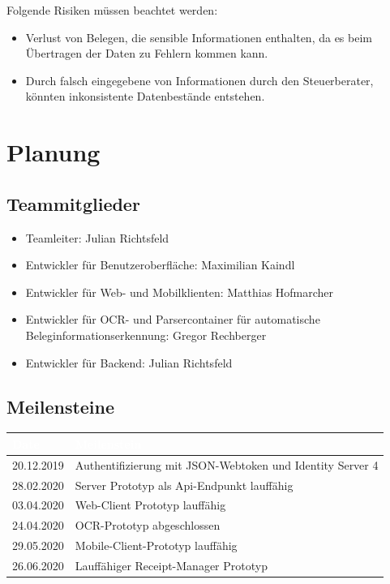 \documentclass[12pt]{article}
\theoremstyle{definition}
\begin{document}
Folgende Risiken müssen beachtet werden:
\begin{itemize}
\item Verlust von Belegen, die sensible Informationen enthalten, da es beim Übertragen der Daten zu Fehlern kommen kann.
\item Durch falsch eingegebene von Informationen durch den Steuerberater, könnten inkonsistente Datenbestände entstehen.
\end{itemize}

\pagebreak

\section{Planung}

\subsection{Teammitglieder}

\begin{itemize}
\item Teamleiter: Julian Richtsfeld
\item Entwickler für Benutzeroberfläche: Maximilian Kaindl
\item Entwickler für Web- und Mobilklienten: Matthias Hofmarcher
\item Entwickler für OCR- und Parsercontainer für automatische Beleginformationserkennung: Gregor Rechberger
\item Entwickler für Backend: Julian Richtsfeld
\end{itemize}

\subsection{Meilensteine}

\begin{tabular}{|l|l|}
\hline
\cellcolor[gray]{0.5}\textcolor{white}{Date} & \cellcolor[gray]{0.5}\textcolor{white}{Meilenstein} \\ \hline
20.12.2019&Authentifizierung mit JSON-Webtoken und Identity Server 4\\ \hline
28.02.2020&Server Prototyp als Api-Endpunkt lauffähig \\ \hline
03.04.2020&Web-Client Prototyp lauffähig \\ \hline
24.04.2020&OCR-Prototyp abgeschlossen \\ \hline
29.05.2020&Mobile-Client-Prototyp lauffähig\\ \hline
26.06.2020&Lauffähiger Receipt-Manager Prototyp\\ \hline
\end{tabular}
\end{document}
